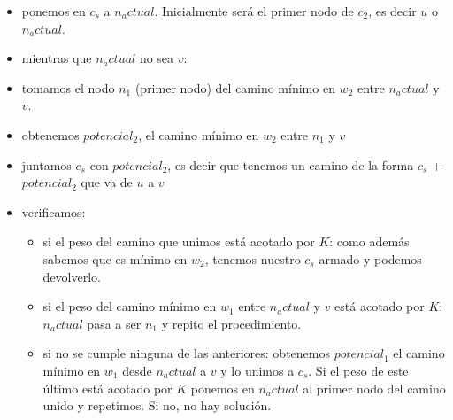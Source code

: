 \begin{itemize}
\item ponemos en $c_s$ a $n_actual$. Inicialmente ser\'a el primer nodo de $c_2$, es decir $u$ o $n_actual$.
\item mientras que $n_actual$ no sea $v$:
\item tomamos el nodo $n_1$ (primer nodo) del camino m\'inimo en $w_2$ entre $n_actual$ y $v$.
\item obtenemos $potencial_2$, el camino m\'inimo en $w_2$ entre $n_1$ y $v$
\item juntamos $c_s$ con $potencial_2$, es decir que tenemos un camino de la forma $c_s$ + $potencial_2$ que va de $u$ a $v$
\item verificamos:
\begin{itemize}
	\item si el peso del camino que unimos est\'a acotado por $K$: como adem\'as sabemos que es m\'inimo en $w_2$, tenemos nuestro $c_s$ armado y podemos devolverlo.
	\item si el peso del camino m\'inimo en $w_1$ entre $n_actual$ y $v$ est\'a acotado por $K$: $n_actual$ pasa a ser $n_1$ y repito el procedimiento.  
	\item si no se cumple ninguna de las anteriores: obtenemos $potencial_1$ el camino m\'inimo en $w_1$ desde $n_actual$ a $v$ y lo unimos a $c_s$. Si el peso de este \'ultimo est\'a acotado por $K$ ponemos en $n_actual$ al primer nodo del camino unido y repetimos. Si no, no hay soluci\'on.
\end{itemize}
\end{itemize}